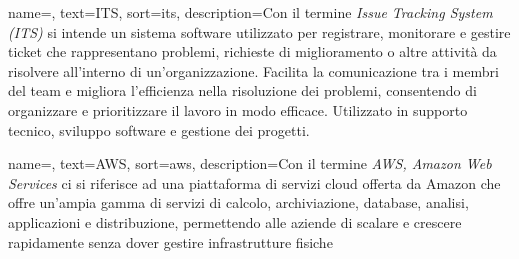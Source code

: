 




 {
    name=,
    text=ITS,
    sort=its,
    description={Con il termine \emph{Issue Tracking System (ITS) } si intende un sistema software utilizzato per registrare, monitorare e gestire ticket che rappresentano problemi, richieste di miglioramento o altre attività da risolvere all’interno di un’organizzazione. Facilita la comunicazione tra i membri del team e migliora l’efficienza nella risoluzione dei problemi, consentendo di organizzare e prioritizzare il lavoro in modo efficace. Utilizzato in supporto tecnico, sviluppo software e gestione dei progetti.}
}

 {
    name=,
    text=AWS,
    sort=aws,
    description={Con il termine \emph{AWS, Amazon Web Services} ci si riferisce ad una piattaforma di servizi cloud offerta da Amazon che offre un’ampia gamma di servizi di calcolo, archiviazione, database, analisi, applicazioni e distribuzione, permettendo alle aziende di scalare e crescere rapidamente senza dover gestire infrastrutture fisiche}
}

